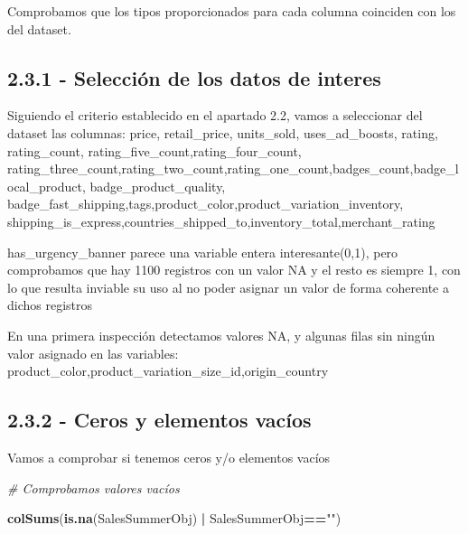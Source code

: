 \documentclass[
]{article}
\newenvironment{Shaded}{\begin{snugshade}}{\end{snugshade}}
\newcommand{\CommentTok}[1]{\textcolor[rgb]{0.56,0.35,0.01}{\textit{#1}}}
\newcommand{\KeywordTok}[1]{\textcolor[rgb]{0.13,0.29,0.53}{\textbf{#1}}}
\newcommand{\NormalTok}[1]{#1}
\newcommand{\OperatorTok}[1]{\textcolor[rgb]{0.81,0.36,0.00}{\textbf{#1}}}
\newcommand{\StringTok}[1]{\textcolor[rgb]{0.31,0.60,0.02}{#1}}
\begin{document}
Comprobamos que los tipos proporcionados para cada columna coinciden con
los del dataset.

\hypertarget{selecciuxf3n-de-los-datos-de-interes}{%
\subsection{2.3.1 - Selección de los datos de
interes}\label{selecciuxf3n-de-los-datos-de-interes}}

Siguiendo el criterio establecido en el apartado 2.2, vamos a
seleccionar del dataset las columnas: price, retail\_price, units\_sold,
uses\_ad\_boosts, rating, rating\_count,
rating\_five\_count,rating\_four\_count,
rating\_three\_count,rating\_two\_count,rating\_one\_count,badges\_count,badge\_local\_product,
badge\_product\_quality,
badge\_fast\_shipping,tags,product\_color,product\_variation\_inventory,
shipping\_is\_express,countries\_shipped\_to,inventory\_total,merchant\_rating

has\_urgency\_banner parece una variable entera interesante(0,1), pero
comprobamos que hay 1100 registros con un valor NA y el resto es siempre
1, con lo que resulta inviable su uso al no poder asignar un valor de
forma coherente a dichos registros

En una primera inspección detectamos valores NA, y algunas filas sin
ningún valor asignado en las variables:
product\_color,product\_variation\_size\_id,origin\_country

\hypertarget{ceros-y-elementos-vacuxedos}{%
\subsection{2.3.2 - Ceros y elementos
vacíos}\label{ceros-y-elementos-vacuxedos}}

Vamos a comprobar si tenemos ceros y/o elementos vacíos

\begin{Shaded}
\begin{Highlighting}[]
\CommentTok{# Comprobamos valores vacíos}

\KeywordTok{colSums}\NormalTok{(}\KeywordTok{is.na}\NormalTok{(SalesSummerObj) }\OperatorTok{|}\StringTok{ }\NormalTok{SalesSummerObj}\OperatorTok{==}\StringTok{""}\NormalTok{)}
\end{Highlighting}
\end{Shaded}
\end{document}
